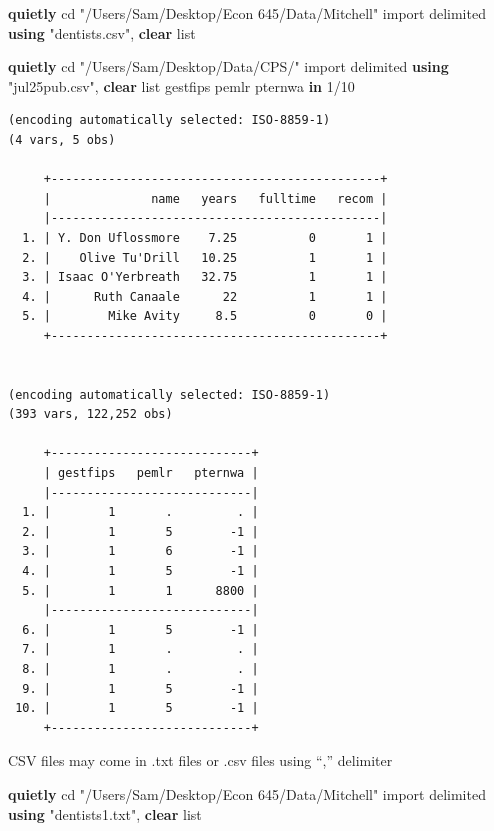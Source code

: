\documentclass[
]{book}
\newenvironment{Shaded}{\begin{snugshade}}{\end{snugshade}}
\newcommand{\KeywordTok}[1]{\textcolor[rgb]{0.13,0.29,0.53}{\textbf{#1}}}
\newcommand{\NormalTok}[1]{#1}
\newcommand{\OtherTok}[1]{\textcolor[rgb]{0.56,0.35,0.01}{#1}}
\newcommand{\StringTok}[1]{\textcolor[rgb]{0.31,0.60,0.02}{#1}}
\begin{document}
\begin{Shaded}
\begin{Highlighting}[]
\KeywordTok{quietly}\NormalTok{ cd }\StringTok{"/Users/Sam/Desktop/Econ 645/Data/Mitchell"}
\NormalTok{import delimited }\KeywordTok{using} \StringTok{"dentists.csv"}\NormalTok{, }\KeywordTok{clear}
\OtherTok{list}

\KeywordTok{quietly}\NormalTok{ cd }\StringTok{"/Users/Sam/Desktop/Data/CPS/"}
\NormalTok{import delimited }\KeywordTok{using} \StringTok{"jul25pub.csv"}\NormalTok{, }\KeywordTok{clear}
\OtherTok{list}\NormalTok{ gestfips pemlr pternwa }\KeywordTok{in}\NormalTok{ 1/10}
\end{Highlighting}
\end{Shaded}

\begin{verbatim}
(encoding automatically selected: ISO-8859-1)
(4 vars, 5 obs)

     +----------------------------------------------+
     |              name   years   fulltime   recom |
     |----------------------------------------------|
  1. | Y. Don Uflossmore    7.25          0       1 |
  2. |    Olive Tu'Drill   10.25          1       1 |
  3. | Isaac O'Yerbreath   32.75          1       1 |
  4. |      Ruth Canaale      22          1       1 |
  5. |        Mike Avity     8.5          0       0 |
     +----------------------------------------------+


(encoding automatically selected: ISO-8859-1)
(393 vars, 122,252 obs)

     +----------------------------+
     | gestfips   pemlr   pternwa |
     |----------------------------|
  1. |        1       .         . |
  2. |        1       5        -1 |
  3. |        1       6        -1 |
  4. |        1       5        -1 |
  5. |        1       1      8800 |
     |----------------------------|
  6. |        1       5        -1 |
  7. |        1       .         . |
  8. |        1       .         . |
  9. |        1       5        -1 |
 10. |        1       5        -1 |
     +----------------------------+
\end{verbatim}

CSV files may come in .txt files or .csv files using ``,'' delimiter

\begin{Shaded}
\begin{Highlighting}[]
\KeywordTok{quietly}\NormalTok{ cd }\StringTok{"/Users/Sam/Desktop/Econ 645/Data/Mitchell"}
\NormalTok{import delimited }\KeywordTok{using} \StringTok{"dentists1.txt"}\NormalTok{, }\KeywordTok{clear}
\OtherTok{list}
\end{Highlighting}
\end{Shaded}
\end{document}

